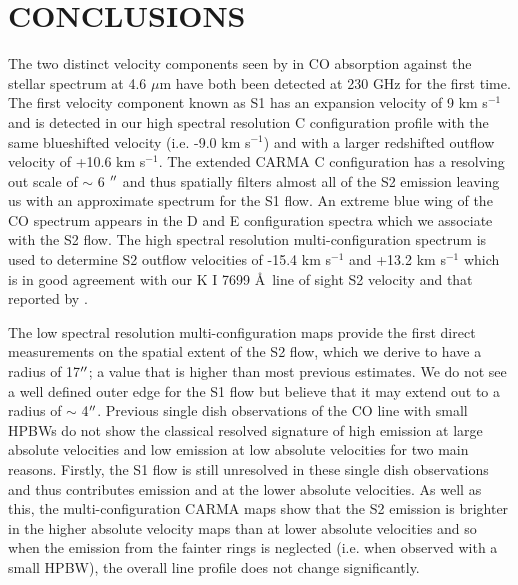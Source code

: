 \documentclass[iop]{emulateapj}
\begin{document}
\section{CONCLUSIONS}
The two distinct velocity components seen by \cite{1979ApJ...233L.135B} in CO absorption against the stellar spectrum at 4.6 $\mu$m have both been detected at 230 GHz for the first time. The first velocity component known as S1 has an expansion velocity of 9 km s${}^{-1}$ \citep{1979ApJ...233L.135B} and is detected in our high spectral resolution C configuration profile with the same blueshifted velocity (i.e. -9.0 km s${}^{-1}$) and with a larger redshifted outflow velocity of +10.6 km s${}^{-1}$. The extended CARMA C configuration has a resolving out scale of $\sim$ 6 $\mbox{$^{\prime\prime}$}$ and thus spatially filters almost all of the S2 emission leaving us with an approximate spectrum for the S1 flow. An extreme blue wing of the CO spectrum appears in the D and E configuration spectra which we associate with the S2 flow. The high spectral resolution multi-configuration spectrum is used to determine S2 outflow velocities of -15.4 km s${}^{-1}$ and +13.2 km s${}^{-1}$ which is in good agreement with our K I 7699 \AA \ line of sight S2 velocity and that reported by \cite{1979ApJ...233L.135B}. 

The low spectral resolution multi-configuration maps provide the first direct measurements on the spatial extent of the S2 flow, which we derive to have a radius of 17$\mbox{$^{\prime\prime}$}$; a value that is higher than most previous estimates. We do not see a well defined outer edge for the S1 flow but believe that it may extend out to a radius of $\sim$ 4$\mbox{$^{\prime\prime}$}$. Previous single dish observations of the CO line with small HPBWs do not show the classical resolved signature of high emission at large absolute velocities and low emission at low absolute velocities for two main reasons. Firstly, the S1 flow is still unresolved in these single dish observations and thus contributes emission and at the lower absolute velocities. As well as this, the multi-configuration CARMA maps show that the S2 emission is brighter in the higher absolute velocity maps than at lower absolute velocities and so when the emission from the fainter rings is neglected (i.e. when observed with a small HPBW), the overall line profile does not change significantly.
\end{document}
